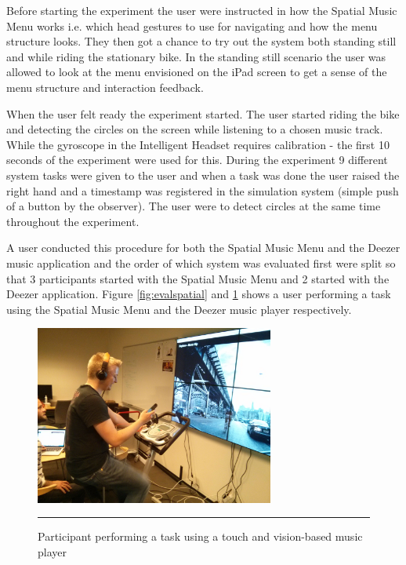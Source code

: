 Before starting the experiment the user were instructed in how the Spatial Music Menu works i.e. which head gestures to use for navigating and how the menu structure looks. They then got a chance to try out the system both standing still and while riding the stationary bike. In the standing still scenario the user was allowed to look at the menu envisioned on the iPad screen to get a sense of the menu structure and interaction feedback.

When the user felt ready the experiment started. The user started riding the bike and detecting the circles on the screen while listening to a chosen music track. While the gyroscope in the Intelligent Headset requires calibration - the first 10 seconds of the experiment were used for this. During the experiment 9 different system tasks were given to the user and when a task was done the user raised the right hand and a timestamp was registered in the simulation system (simple push of a button by the observer). The user were to detect circles at the same time throughout the experiment.

A user conducted this procedure for both the Spatial Music Menu and the Deezer music application and the order of which system was evaluated first were split so that 3 participants started with the Spatial Music Menu and 2 started with the Deezer application. Figure \ref{fig:evalspatial} and \ref{fig:evalnormal} shows a user performing a task using the Spatial Music Menu and the Deezer music player respectively.

\begin{figure}[t]
	\centering
		\includegraphics[width=0.7\textwidth,height=\textheight,keepaspectratio]{./Figures/evaluation_normal.jpg}
		\rule{35em}{1pt}
	\caption[Evaluation touch and vision-based interface]{Participant performing a task using a touch and vision-based music player}
	\label{fig:evalnormal}
\end{figure}

